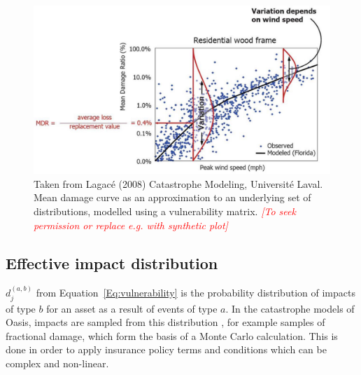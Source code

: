 \documentclass[a4paper,11pt]{extarticle} %
\begin{document}
{\begin{figure}[ht]
\begin{framed}
		\includegraphics[width=\textwidth]{plots/vulnerability_lagace_2008.png}
		
	\end{framed}
	
	\footnotesize
	
	\renewcommand{\arraystretch}{1.01}
	
	\vspace{-3ex}
	
	
	\vspace{-0.5ex}
	
	\caption{\small Taken from Lagacé (2008) Catastrophe Modeling, Université Laval. Mean damage curve as an approximation to an underlying set of distributions, modelled using a vulnerability matrix. {\textcolor{red}{\emph{[To seek permission or replace e.g. with synthetic plot]}}}}
	\label{Fig:vulnerability_matrix}
	
\end{figure}




\subsection{Effective impact distribution}
$d^{(a,b)}_j$ from Equation~\ref{Eq:vulnerability} is the probability distribution of impacts of type $b$ for an asset as a result of events of type $a$. In the catastrophe models of Oasis, impacts are sampled from this distribution \cite{OasisFinancialModule}, for example samples of fractional damage, which form the basis of a Monte Carlo calculation. This is done in order to apply insurance policy terms and conditions which can be complex and non-linear.

}
\end{document}
